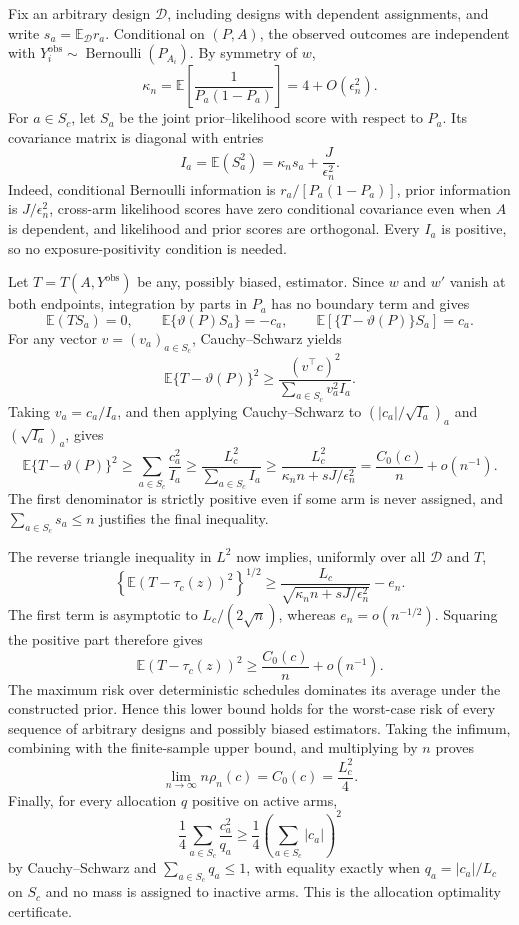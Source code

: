 Fix an arbitrary design \(\mathcal D\), including designs with dependent assignments, and write \(s_a=\mathbb E_{\mathcal D}r_a\).  Conditional on \((P,A)\), the observed outcomes are independent with
\(Y_i^{\mathrm{obs}}\sim\operatorname{Bernoulli}(P_{A_i})\).  By symmetry of \(w\),
\[
 \kappa_n=\mathbb E\!\left[\frac1{P_a(1-P_a)}\right]
 =4+O(\epsilon_n^2).
\]
For \(a\in S_c\), let \(S_a\) be the joint prior--likelihood score with respect to \(P_a\).  Its covariance matrix is diagonal with entries
\[
 I_a=\mathbb E(S_a^2)=\kappa_ns_a+\frac{J}{\epsilon_n^2}.
\]
Indeed, conditional Bernoulli information is \(r_a/[P_a(1-P_a)]\), prior information is \(J/\epsilon_n^2\), cross-arm likelihood scores have zero conditional covariance even when \(A\) is dependent, and likelihood and prior scores are orthogonal.  Every \(I_a\) is positive, so no exposure-positivity condition is needed.

Let \(T=T(A,Y^{\mathrm{obs}})\) be any, possibly biased, estimator.  Since \(w\) and \(w'\) vanish at both endpoints, integration by parts in \(P_a\) has no boundary term and gives
\[
 \mathbb E(TS_a)=0,
 \qquad
 \mathbb E\{\vartheta(P)S_a\}=-c_a,
 \qquad
 \mathbb E[\{T-\vartheta(P)\}S_a]=c_a.
\]
For any vector \(v=(v_a)_{a\in S_c}\), Cauchy--Schwarz yields
\[
 \mathbb E\{T-\vartheta(P)\}^2
 \ge\frac{(v^\top c)^2}{\sum_{a\in S_c}v_a^2I_a}.
\]
Taking \(v_a=c_a/I_a\), and then applying Cauchy--Schwarz to
\((|c_a|/\sqrt{I_a})_a\) and \((\sqrt{I_a})_a\), gives
\[
 \mathbb E\{T-\vartheta(P)\}^2
 \ge\sum_{a\in S_c}\frac{c_a^2}{I_a}
 \ge\frac{L_c^2}{\sum_{a\in S_c}I_a}
 \ge\frac{L_c^2}{\kappa_n n+sJ/\epsilon_n^2}
 =\frac{C_0(c)}n+o(n^{-1}).
\]
The first denominator is strictly positive even if some arm is never assigned, and
\(\sum_{a\in S_c}s_a\le n\) justifies the final inequality.

The reverse triangle inequality in \(L^2\) now implies, uniformly over all \(\mathcal D\) and \(T\),
\[
 \left\{\mathbb E(T-\tau_c(z))^2\right\}^{1/2}
 \ge\frac{L_c}{\sqrt{\kappa_n n+sJ/\epsilon_n^2}}-e_n.
\]
The first term is asymptotic to \(L_c/(2\sqrt n)\), whereas \(e_n=o(n^{-1/2})\).  Squaring the positive part therefore gives
\[
 \mathbb E(T-\tau_c(z))^2\ge\frac{C_0(c)}n+o(n^{-1}).
\]
The maximum risk over deterministic schedules dominates its average under the constructed prior.  Hence this lower bound holds for the worst-case risk of every sequence of arbitrary designs and possibly biased estimators.  Taking the infimum, combining with the finite-sample upper bound, and multiplying by \(n\) proves
\[
 \lim_{n\to\infty}n\rho_n(c)=C_0(c)=\frac{L_c^2}{4}.
\]
Finally, for every allocation \(q\) positive on active arms,
\[
 \frac14\sum_{a\in S_c}\frac{c_a^2}{q_a}
 \ge\frac14\left(\sum_{a\in S_c}|c_a|\right)^2
\]
by Cauchy--Schwarz and \(\sum_{a\in S_c}q_a\le1\), with equality exactly when \(q_a=|c_a|/L_c\) on \(S_c\) and no mass is assigned to inactive arms.  This is the allocation optimality certificate.